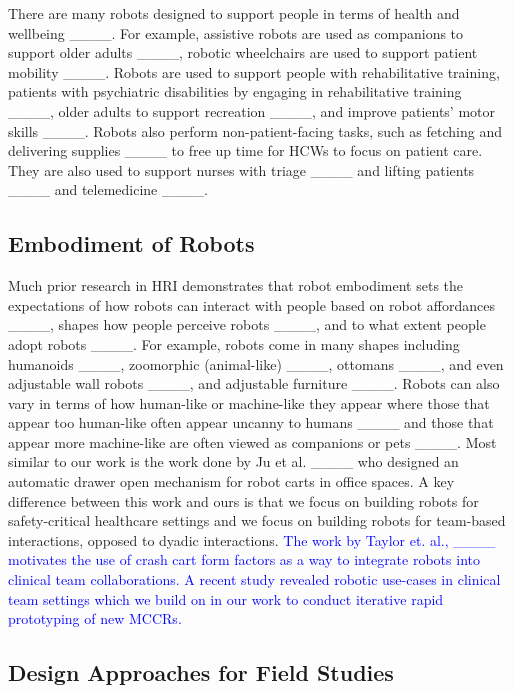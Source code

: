 There are many robots designed to support people in terms of health and wellbeing ____.
For example, assistive robots are used as companions to support older adults ____, robotic wheelchairs are used to support patient mobility ____. 
Robots are used to support people with rehabilitative training, patients with psychiatric disabilities by engaging in rehabilitative training ____, older adults to support recreation  ____, and improve patients' motor skills ____.
Robots also perform non-patient-facing tasks, such as fetching and delivering supplies ____ to free up time for HCWs to focus on patient care. 
They are also used to support nurses with triage ____ and lifting patients ____ and telemedicine ____.%






\subsection{Embodiment of Robots}

Much prior research in HRI demonstrates that robot embodiment sets the expectations of how robots can interact with people based on robot affordances ____, shapes how people perceive robots ____, and to what extent people adopt robots ____.
For example, robots come in many shapes including humanoids ____, zoomorphic (animal-like) ____, ottomans ____, and even adjustable wall robots ____, and adjustable furniture ____.
Robots can also vary in terms of how human-like or machine-like they appear where those that appear too human-like often appear uncanny to humans ____ and those that appear more machine-like are often viewed as companions or pets ____. 
Most similar to our work is the work done by Ju et al. ____ who designed an automatic drawer open mechanism for robot carts in office spaces.
A key difference between this work and ours is that we focus on building robots for safety-critical healthcare settings and we focus on building robots for team-based interactions, opposed to dyadic interactions.
\textcolor{blue}{The work by Taylor et. al., ____ motivates the use of crash cart form factors as a way to integrate robots into clinical team collaborations. A recent study revealed robotic use-cases in clinical team settings which we build on in our work to conduct iterative rapid prototyping of new MCCRs.}

\subsection{Design Approaches for Field Studies}

